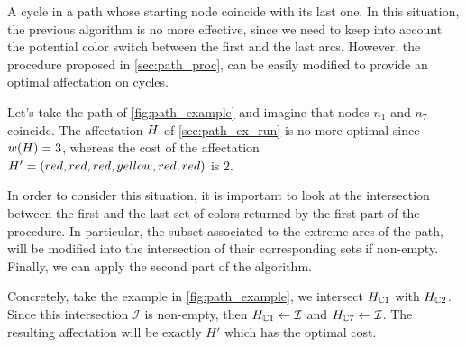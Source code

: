 A cycle in a path whose starting node coincide with its last one.
In this situation, the previous algorithm is no more effective, since we need to keep into account the potential color switch between the first and the last arcs.
However, the procedure proposed in \cref{sec:path_proc}, can be easily modified to provide an optimal affectation on cycles.

Let's take the path of \cref{fig:path_example} and imagine that nodes $n_1$ and $n_7$ coincide.
The affectation $H$ of \cref{sec:path_ex_run} is no more optimal since $w(H) = 3$, whereas the cost of the affectation $H' = (red, red, red, yellow, red, red)$ is $2$.

In order to consider this situation, it is important to look at the intersection between the first and the last set of colors returned by the first part of the procedure. In particular, the subset associated to the extreme arcs of the path, will be modified into the intersection of their corresponding sets if non-empty. Finally, we can apply the second part of the algorithm.

Concretely, take the example in \cref{fig:path_example}, we intersect $H_{\mathbb{C}1}$ with $H_{\mathbb{C}2}$. Since this intersection $\mathcal{I}$ is non-empty, then $H_{\mathbb{C}1} \gets \mathcal{I}$ and $H_{\mathbb{C}7} \gets \mathcal{I}$. The resulting affectation will be exactly $H'$ which has the optimal cost.


